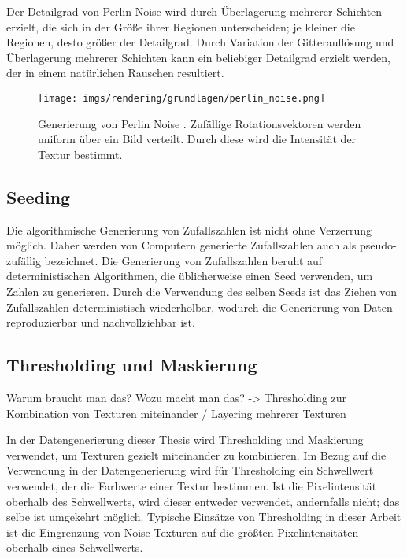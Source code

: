 Der Detailgrad von Perlin Noise wird durch Überlagerung mehrerer Schichten erzielt, die sich in der Größe ihrer Regionen unterscheiden; je kleiner die Regionen, desto größer der Detailgrad. Durch Variation der Gitterauflösung und Überlagerung mehrerer Schichten kann ein beliebiger Detailgrad erzielt werden, der in einem natürlichen Rauschen resultiert.

\begin{figure}
    \centering
    \texttt{[image: imgs/rendering/grundlagen/perlin\_noise.png]}
    \caption{Generierung von Perlin Noise \cite{perlin_noise_img}. Zufällige Rotationsvektoren werden uniform über ein Bild verteilt. Durch diese wird die Intensität der Textur bestimmt.}
    \label{img:perlin_noise_generation}
\end{figure}

\subsection{Seeding}

Die algorithmische Generierung von Zufallszahlen ist nicht ohne Verzerrung möglich. Daher werden von Computern generierte Zufallszahlen auch als pseudo-zufällig bezeichnet. Die Generierung von Zufallszahlen beruht auf deterministischen Algorithmen, die üblicherweise einen Seed verwenden, um Zahlen zu generieren. Durch die Verwendung des selben Seeds ist das Ziehen von Zufallszahlen deterministisch wiederholbar, wodurch die Generierung von Daten reproduzierbar und nachvollziehbar ist.

\subsection{Thresholding und Maskierung}

Warum braucht man das? Wozu macht man das? -> Thresholding zur Kombination von Texturen miteinander / Layering mehrerer Texturen

In der Datengenerierung dieser Thesis wird Thresholding und Maskierung verwendet, um Texturen gezielt miteinander zu kombinieren. Im Bezug auf die Verwendung in der Datengenerierung wird  für Thresholding ein Schwellwert verwendet, der die Farbwerte einer Textur bestimmen. Ist die Pixelintensität oberhalb des Schwellwerts, wird dieser entweder verwendet, andernfalls nicht; das selbe ist umgekehrt möglich. Typische Einsätze von Thresholding in dieser Arbeit ist die Eingrenzung von Noise-Texturen auf die größten Pixelintensitäten oberhalb eines Schwellwerts.

